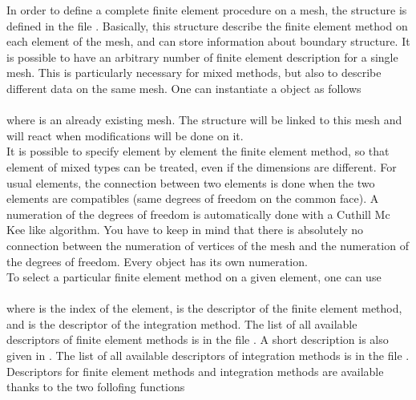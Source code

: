 \documentclass[11pt,a4paper]{article}
\begin{document}
In order to define a complete finite element procedure on a mesh, the structure  is defined in the file . Basically, this structure describe the finite element method on each element of the mesh, and can store information about boundary structure. It is possible to have an arbitrary number of finite element description for a single mesh. This is particularly necessary for mixed methods, but also to describe different data on the same mesh. One can instantiate a  object as follows\\[0.5cm]
\\[0.5cm]
where  is an already existing mesh. The structure will be linked to this mesh and will react when modifications will be done on it. \\[0.5cm]
It is possible to specify element by element the finite element method, so that element of mixed types can be treated, even if the dimensions are different. For usual elements, the connection between two elements is done when the two elements are compatibles (same degrees of freedom on the common face). A numeration of the degrees of freedom is automatically done with a Cuthill Mc Kee like algorithm. You have to keep in mind that there is absolutely no connection between the numeration of vertices of the mesh and the numeration of the degrees of freedom. Every  object has its own numeration. \\[0.5cm]
To select a particular finite element method on a given element, one can use \\[0.5cm]
\\[0.5cm]
where  is the index of the element,  is the descriptor of the finite element method, and  is the descriptor of the integration method. The list of all available descriptors of finite element methods is in the file . A short description is also given in \cite{BASCOMP}. The list of all available descriptors of integration methods is in the file . \\[0.5cm]
Descriptors for finite element methods and integration methods are available thanks to the two follofing functions\\[0.5cm]
\end{document}

